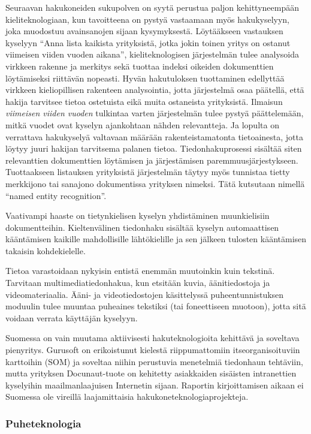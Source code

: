 \begin{multicols}{2}
Seuraavan hakukoneiden sukupolven on syytä perustua paljon kehittyneempään kieliteknologiaan, kun tavoitteena on pystyä vastaamaan myös hakukyselyyn, joka muodostuu avainsanojen sijaan kysymyksestä. Löytääkseen vastauksen kyselyyn ``Anna lista kaikista yrityksistä, jotka jokin toinen yritys on ostanut viimeisen viiden vuoden aikana'', kieliteknologisen järjestelmän tulee analysoida virkkeen rakenne ja merkitys sekä tuottaa indeksi oikeiden dokumenttien löytämiseksi riittävän nopeasti.  Hyvän hakutuloksen tuottaminen edellyttää virkkeen kieliopillisen rakenteen analysointia, jotta järjestelmä osaa päätellä, että hakija tarvitsee tietoa ostetuista eikä muita ostaneista yrityksistä. Ilmaisun \textit{viimeisen viiden vuoden} tulkintaa varten järjestelmän tulee pystyä päättelemään, mitkä vuodet ovat kyselyn ajankohtaan nähden relevantteja. Ja lopulta on verrattava hakukyselyä valtavaan määrään rakenteistamatonta tietoainesta, jotta löytyy juuri hakijan tarvitsema palanen tietoa. Tiedonhakuprosessi sisältää siten relevanttien dokumenttien löytämisen ja järjestämisen paremmuusjärjestykseen. Tuottaakseen listauksen yrityksistä järjestelmän täytyy myös tunnistaa tietty merkkijono tai sana\-jono dokumentissa yrityksen nimeksi. Tätä kutsutaan nimellä ``named entity recognition''.

Vaativampi haaste on tietynkielisen kyselyn yhdistäminen muunkielisiin dokumentteihin. Kieltenvälinen tiedonhaku sisältää kyselyn automaattisen kääntämisen kaikille mahdollisille lähtökielille ja sen jälkeen tulosten kääntämisen takaisin kohdekielelle.

Tietoa varastoidaan nykyisin entistä enemmän muutoinkin kuin tekstinä. Tarvitaan multimediatiedonhakua, kun etsitään kuvia, äänitiedostoja ja videomateriaalia. Ääni- ja videotiedostojen käsittelyssä puheentunnistuksen moduulin tulee muuntaa puheaines tekstiksi (tai foneettiseen muotoon), jotta sitä voidaan verrata käyttäjän kyselyyn.

Suomessa on vain muutama aktiivisesti hakuteknologioita kehittävä ja soveltava pienyritys. Gurusoft on erikoistunut kielestä riippumattomiin itseorganisoituviin karttoihin (SOM) ja soveltaa niihin perustuvia menetelmiä tiedonhaun tehtäviin, mutta yrityksen Docunaut-tuote on kehitetty asiakkaiden sisäisten intranettien kyselyihin maailmanlaajuisen Internetin sijaan. Raportin kirjoittamisen aikaan ei Suomessa ole vireillä laajamittaisia hakukoneteknologiaprojekteja.

\subsubsection{Puheteknologia}


\end{multicols}
